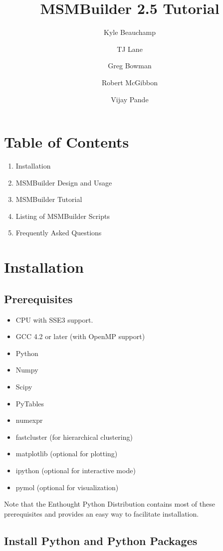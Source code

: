 \documentclass[12pt]{article}
\title
{MSMBuilder 2.5 Tutorial
}
\author{Kyle Beauchamp \and TJ Lane \and Greg Bowman \and  Robert McGibbon \and Vijay Pande}
\begin{document}
\maketitle

\section{Table of Contents}
\begin{enumerate}
\item Installation
\item MSMBuilder Design and Usage
\item MSMBuilder Tutorial
\item Listing of MSMBuilder Scripts
\item Frequently Asked Questions
\end{enumerate}

\newpage

\section{Installation}

\subsection{Prerequisites}
\begin{itemize}
 \item CPU with SSE3 support.
\item GCC 4.2 or later (with OpenMP support)
\item Python
\item Numpy
\item Scipy
\item PyTables
\item numexpr
\item fastcluster (for hierarchical clustering)
\item matplotlib (optional for plotting)
\item ipython (optional for interactive mode)
\item pymol (optional for visualization)
\end{itemize}
Note that the Enthought Python Distribution contains most of these prerequisites and provides an easy way to facilitate installation.

\subsection{Install Python and Python Packages}
\end{document}
